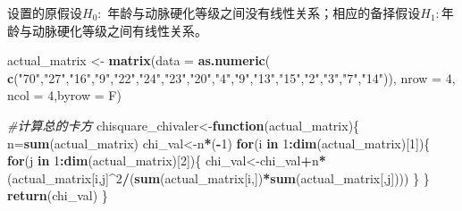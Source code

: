 \documentclass[
]{article}
\newenvironment{Shaded}{\begin{snugshade}}{\end{snugshade}}
\newcommand{\CommentTok}[1]{\textcolor[rgb]{0.56,0.35,0.01}{\textit{#1}}}
\newcommand{\ControlFlowTok}[1]{\textcolor[rgb]{0.13,0.29,0.53}{\textbf{#1}}}
\newcommand{\DataTypeTok}[1]{\textcolor[rgb]{0.13,0.29,0.53}{#1}}
\newcommand{\DecValTok}[1]{\textcolor[rgb]{0.00,0.00,0.81}{#1}}
\newcommand{\KeywordTok}[1]{\textcolor[rgb]{0.13,0.29,0.53}{\textbf{#1}}}
\newcommand{\NormalTok}[1]{#1}
\newcommand{\OperatorTok}[1]{\textcolor[rgb]{0.81,0.36,0.00}{\textbf{#1}}}
\newcommand{\StringTok}[1]{\textcolor[rgb]{0.31,0.60,0.02}{#1}}
\begin{document}
设置的原假设\(H_0:\) 年龄与动脉硬化等级之间没有线性关系；相应的备择假设\(H_1:\)年龄与动脉硬化等级之间有线性关系。

\begin{Shaded}
\begin{Highlighting}[]
\NormalTok{actual_matrix <-}\StringTok{ }\KeywordTok{matrix}\NormalTok{(}\DataTypeTok{data =} \KeywordTok{as.numeric}\NormalTok{( }\KeywordTok{c}\NormalTok{(}\StringTok{"70"}\NormalTok{,}\StringTok{"27"}\NormalTok{,}\StringTok{"16"}\NormalTok{,}\StringTok{"9"}\NormalTok{,}\StringTok{"22"}\NormalTok{,}\StringTok{"24"}\NormalTok{,}\StringTok{"23"}\NormalTok{,}\StringTok{"20"}\NormalTok{,}\StringTok{"4"}\NormalTok{,}\StringTok{"9"}\NormalTok{,}\StringTok{"13"}\NormalTok{,}\StringTok{"15"}\NormalTok{,}\StringTok{"2"}\NormalTok{,}\StringTok{"3"}\NormalTok{,}\StringTok{"7"}\NormalTok{,}\StringTok{"14"}\NormalTok{)), }
\DataTypeTok{nrow =} \DecValTok{4}\NormalTok{, }\DataTypeTok{ncol =} \DecValTok{4}\NormalTok{,}\DataTypeTok{byrow =}\NormalTok{ F)}

\CommentTok{#计算总的卡方}
\NormalTok{chisquare_chivaler<-}\ControlFlowTok{function}\NormalTok{(actual_matrix)\{}
\NormalTok{     n=}\KeywordTok{sum}\NormalTok{(actual_matrix)}
\NormalTok{     chi_val<-n}\OperatorTok{*}\NormalTok{(}\OperatorTok{-}\DecValTok{1}\NormalTok{)}
     \ControlFlowTok{for}\NormalTok{(i }\ControlFlowTok{in} \DecValTok{1}\OperatorTok{:}\KeywordTok{dim}\NormalTok{(actual_matrix)[}\DecValTok{1}\NormalTok{])\{}
          \ControlFlowTok{for}\NormalTok{(j }\ControlFlowTok{in} \DecValTok{1}\OperatorTok{:}\KeywordTok{dim}\NormalTok{(actual_matrix)[}\DecValTok{2}\NormalTok{])\{}
\NormalTok{               chi_val<-chi_val}\OperatorTok{+}\NormalTok{n}\OperatorTok{*}\NormalTok{(actual_matrix[i,j]}\OperatorTok{^}\DecValTok{2}\OperatorTok{/}\NormalTok{(}\KeywordTok{sum}\NormalTok{(actual_matrix[i,])}\OperatorTok{*}\KeywordTok{sum}\NormalTok{(actual_matrix[,j])))}
\NormalTok{          \}}
\NormalTok{     \}}
     \KeywordTok{return}\NormalTok{(chi_val)}
\NormalTok{\}}


\end{Highlighting}
\end{Shaded}
\end{document}
